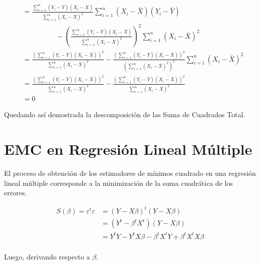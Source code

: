 \documentclass[
  11pt,
]{book}
\theoremstyle{definition}
\theoremstyle{definition}
\theoremstyle{definition}
\theoremstyle{definition}
\theoremstyle{remark}
\begin{document}
\begin{equation}
\begin{split}
&= \frac{\displaystyle\sum_{i=1}^n (Y_i - \bar{Y})(X_i - \bar{X})}{\displaystyle\sum_{i=1}^n(X_i -\bar{X})^2}\sum_{i=1}^n\left(X_i -\bar{X} \right) \left( Y_i - \bar{Y}\right)\\
& \hspace{2cm} - \left( \frac{\displaystyle\sum_{i=1}^n (Y_i - \bar{Y})(X_i - \bar{X})}{\displaystyle\sum_{i=1}^n(X_i -\bar{X})^2} \right)^2\sum_{i=1}^n\left(X_i -\bar{X} \right)^2 \\
&= \frac{\left(\displaystyle\sum_{i=1}^n (Y_i - \bar{Y})(X_i - \bar{X})\right)^2}{\displaystyle\sum_{i=1}^n(X_i -\bar{X})^2} - \frac{\left( \displaystyle\sum_{i=1}^n (Y_i - \bar{Y})(X_i - \bar{X})\right)^2}{\left(\displaystyle\sum_{i=1}^n(X_i -\bar{X})^2\right)^2} \sum_{i=1}^n\left(X_i -\bar{X} \right)^2 \\
&= \frac{\left(\displaystyle\sum_{i=1}^n (Y_i - \bar{Y})(X_i - \bar{X})\right)^2}{\displaystyle\sum_{i=1}^n(X_i -\bar{X})^2} - \frac{\left( \displaystyle\sum_{i=1}^n (Y_i - \bar{Y})(X_i - \bar{X})\right)^2}{\displaystyle\sum_{i=1}^n(X_i -\bar{X})^2}\\
& = 0
\end{split}
\label{eq:demostracionSCT5}
\end{equation}

Quedando así demostrada la descomposición de las Suma de Cuadrados Total.

\section{EMC en Regresión Lineal Múltiple}\label{RLM-EMC}

El proceso de obtención de los estimadores de mínimos cuadrado en una regresión lineal múltiple corresponde a la minimización de la suma cuadrática de los errores.

\begin{equation}
\begin{split}
S(\beta) = \varepsilon^t\varepsilon &= (Y - X\beta)^t(Y - X\beta)\\
&= (Y^t - \beta^tX^t)(Y - X\beta)\\
&= Y^tY - Y^tX\beta - \beta^tX^tY + \beta^tX^tX\beta\\
\end{split}
\label{eq:betasmultiple-demostracion}
\end{equation}

Luego, derivando respecto a \(\beta\).
\end{document}
